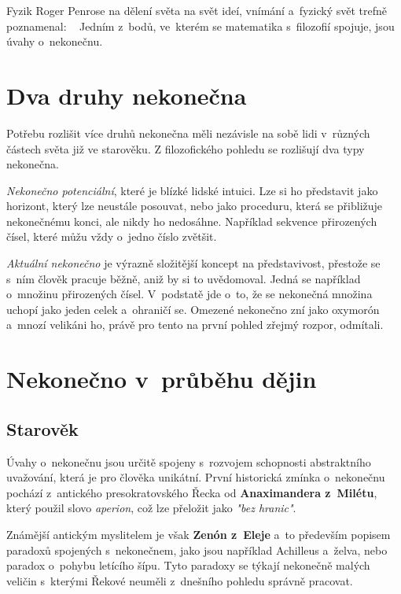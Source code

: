 \documentclass[czech]{article}
\begin{document}
Fyzik Roger Penrose na dělení světa na svět ideí, vnímání a~fyzický svět trefně poznamenal:
~\cite{livio}
Jedním z~bodů, ve~kterém se matematika s~filozofií spojuje, jsou úvahy o~nekonečnu.


\section*{Dva druhy nekonečna}

Potřebu rozlišit více druhů nekonečna měli nezávisle na sobě lidi v~různých částech světa již ve starověku.
Z filozofického pohledu se rozlišují dva typy nekonečna. 

\textit{Nekonečno potenciální}, které je blízké lidské intuici. Lze si ho představit jako horizont, který lze neustále posouvat, nebo jako proceduru, která se přibližuje nekonečnému konci, ale nikdy ho nedosáhne. Například sekvence přirozených čísel, které můžu vždy o~jedno číslo zvětšit.

\textit{Aktuální nekonečno} je výrazně složitější koncept na představivost, přestože se s~ním člověk pracuje běžně, aniž by si to uvědomoval. Jedná se například o~množinu přirozených čísel. V~podstatě jde o~to, že se nekonečná množina uchopí jako jeden celek a~ohraničí se. Omezené nekonečno zní jako oxymorón a~mnozí velikáni ho, právě pro tento na první pohled zřejmý rozpor, odmítali.

\section*{Nekonečno v~průběhu dějin}

\subsection*{Starověk}
Úvahy o~nekonečnu jsou určitě spojeny s~rozvojem schopnosti abstraktního uvažování, která je pro člověka unikátní. První historická zmínka o~nekonečnu pochází z~antického presokratovského Řecka od \textbf{Anaximandera z~Milétu}, který použil slovo \textit{aperion}, což lze přeložit jako \textit{"bez hranic"}.~\cite{wallace}

Známější antickým myslitelem je však \textbf{Zenón z~Eleje} a~to především popisem paradoxů spojených s~nekonečnem, jako jsou například Achilleus a~želva, nebo paradox o~pohybu letícího šípu. Tyto paradoxy se týkají nekonečně malých veličin s~kterými Řekové neuměli z~dnešního pohledu správně pracovat.
\end{document}
